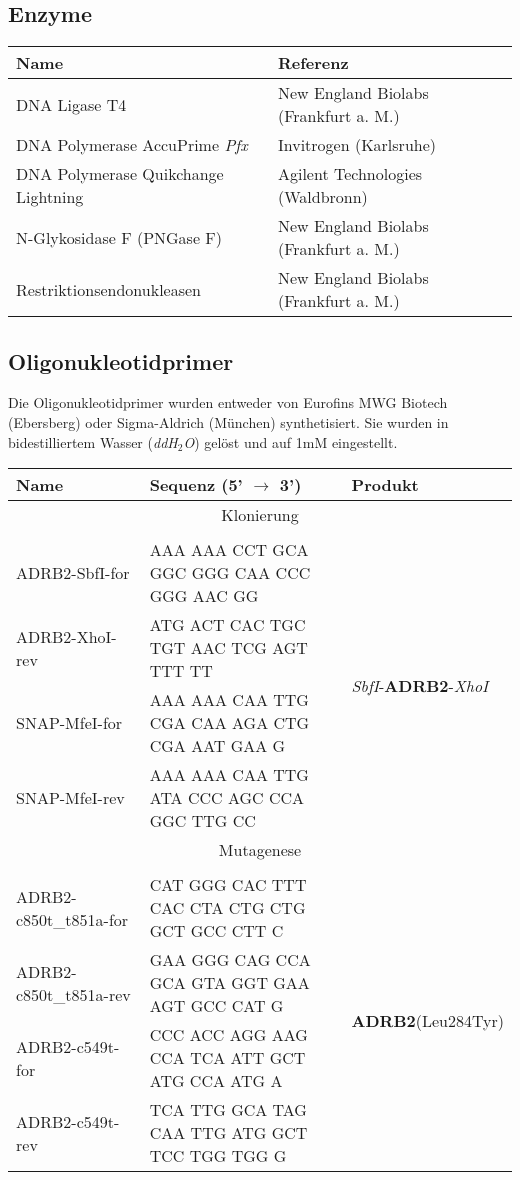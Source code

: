 \subsection{Enzyme}
\begin{table}[htsb]
\begin{tabularx}{\textwidth}{lll}
\toprule
Name							&	Referenz\\
\midrule
DNA Ligase T4							&	New England Biolabs (Frankfurt a. M.)\\
DNA Polymerase AccuPrime \textit{Pfx}	&	Invitrogen (Karlsruhe)\\
DNA Polymerase Quikchange Lightning		&	Agilent Technologies (Waldbronn)\\
N-Glykosidase F (PNGase F)				&	New England Biolabs (Frankfurt a. M.)\\
Restriktionsendonukleasen				&	New England Biolabs (Frankfurt a. M.)\\
\bottomrule
\end {tabularx}
\end{table}

\subsection{Oligonukleotidprimer}
Die Oligonukleotidprimer wurden entweder von Eurofins MWG Biotech (Ebersberg) oder Sigma-Aldrich (München) synthetisiert. Sie wurden in bidestilliertem Wasser (\textit{ddH$_2$O}) gelöst und auf 1\si{\milli M} eingestellt. 
\begin{table}[htsb] 
\begin{tabularx}{\textwidth}{lXl}
\toprule
Name		&	Sequenz 	(5' $\rightarrow$ 3')	&	Produkt\\
\midrule
\multicolumn{3}{c}{Klonierung}\\
&&\\
ADRB2-SbfI-for	& 	AAA AAA CCT GCA GGC GGG CAA CCC GGG AAC GG	&	\multirow{4}{*}{\textit{SbfI}-\textbf{ADRB2}-\textit{XhoI}}\\
ADRB2-XhoI-rev	&	ATG ACT CAC TGC TGT AAC TCG AGT TTT TT		&	\\
\midrule
SNAP-MfeI-for	&	AAA AAA CAA TTG CGA CAA AGA CTG CGA AAT GAA G 	& \multirow{4}{*}{\textit{MfeI}-\textbf{SNAP-tag}-\textit{MfeI}}\\
SNAP-MfeI-rev	&	AAA AAA CAA TTG ATA CCC AGC CCA GGC TTG CC		& \\
\midrule
\multicolumn{3}{c}{Mutagenese}\\
&&\\
ADRB2-c850t\_t851a-for	& 	CAT GGG CAC TTT CAC CTA CTG CTG GCT GCC CTT C & \multirow{4}{*}{\textbf{ADRB2}(Leu284Tyr)}\\
ADRB2-c850t\_t851a-rev	&	GAA GGG CAG CCA GCA GTA GGT GAA AGT GCC CAT G &	\\
\midrule
ADRB2-c549t-for & CCC ACC AGG AAG CCA TCA ATT GCT ATG CCA ATG A & \multirow{4}{*}{\textbf{ADRB2}-MfeI-\textbf{ADRB2}'}\\
ADRB2-c549t-rev & TCA TTG GCA TAG CAA TTG ATG GCT TCC TGG TGG G & \\
\bottomrule
\end{tabularx}
\end{table}


